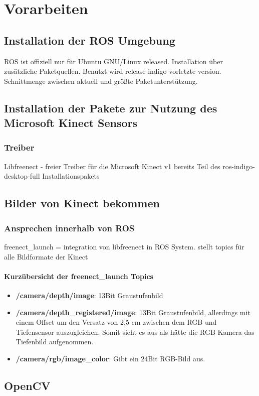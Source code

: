 \chapter{Vorarbeiten}
	\section{Installation der ROS Umgebung}
	ROS ist offiziell nur für Ubuntu GNU/Linux released. Installation über zusätzliche Paketquellen. Benutzt wird release indigo vorletzte version. Schnittmenge zwischen aktuell und größte Paketunterstützung.
	\section{Installation der Pakete zur Nutzung des Microsoft Kinect Sensors}
		\subsection{Treiber}
		Libfreenect - freier Treiber für die Microsoft Kinect v1
		bereits Teil des ros-indigo-desktop-full Installationspakets
	\section{Bilder von Kinect bekommen}
		\subsection{Ansprechen innerhalb von ROS}
		freenect\_launch =  integration von libfreenect in ROS System. stellt topics für alle Bildformate der Kinect
			\subsubsection{Kurzübersicht der freenect\_launch Topics}
			\begin{itemize}
			\item \textbf{/camera/depth/image}: 13Bit Graustufenbild
			\item \textbf{/camera/depth\_registered/image}: 13Bit Graustufenbild, allerdings mit einem Offset um den Versatz von 2,5 cm zwischen dem RGB und Tiefensensor auszugleichen. Somit sieht es aus als hätte die RGB-Kamera das Tiefenbild aufgenommen.
			\item \textbf{/camera/rgb/image\_color}: Gibt ein 24Bit RGB-Bild aus.
			\end{itemize}
	\section{OpenCV}
